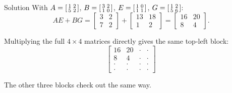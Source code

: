 \documentclass[10pt,aspectratio=169]{beamer}
\begin{document}
\begin{frame}{Solution}
  With $A = \begin{bsmallmatrix}1&2\\5&2\end{bsmallmatrix}$,
  $B = \begin{bsmallmatrix}3&2\\1&0\end{bsmallmatrix}$,
  $E = \begin{bsmallmatrix}1&0\\1&1\end{bsmallmatrix}$,
  $G = \begin{bsmallmatrix}1&2\\5&6\end{bsmallmatrix}$:
  \[
    AE + BG
    = \begin{bmatrix}3&2\\7&2\end{bmatrix}
    + \begin{bmatrix}13&18\\1&2\end{bmatrix}
    = \begin{bmatrix}16&20\\8&4\end{bmatrix}.
  \]

  \bigskip
  Multiplying the full $4 \times 4$ matrices directly gives the same top-left block:
  \[
    \begin{bmatrix}
      16 & 20 & \cdot & \cdot \\
       8 &  4 & \cdot & \cdot \\
     \cdot & \cdot & \cdot & \cdot \\
     \cdot & \cdot & \cdot & \cdot
    \end{bmatrix}
  \]

  \begin{center}
    \small The other three blocks check out the same way.
  \end{center}
\end{frame}
\end{document}
